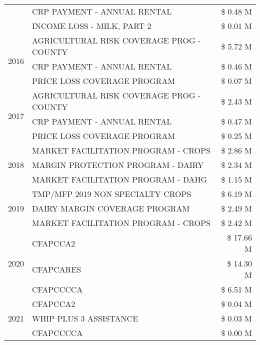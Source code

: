 \begin{tabular}{llr}
 & CRP PAYMENT - ANNUAL RENTAL & \$ 0.48 M \\
 & INCOME LOSS - MILK, PART 2 & \$ 0.01 M \\
\cline{1-3}
\multirow[t]{3}{*}{2016} & AGRICULTURAL RISK COVERAGE PROG - COUNTY & \$ 5.72 M \\
 & CRP PAYMENT - ANNUAL RENTAL & \$ 0.46 M \\
 & PRICE LOSS COVERAGE PROGRAM & \$ 0.07 M \\
\cline{1-3}
\multirow[t]{3}{*}{2017} & AGRICULTURAL RISK COVERAGE PROG - COUNTY & \$ 2.43 M \\
 & CRP PAYMENT - ANNUAL RENTAL & \$ 0.47 M \\
 & PRICE LOSS COVERAGE PROGRAM & \$ 0.25 M \\
\cline{1-3}
\multirow[t]{3}{*}{2018} & MARKET FACILITATION PROGRAM - CROPS & \$ 2.86 M \\
 & MARGIN PROTECTION PROGRAM - DAIRY & \$ 2.34 M \\
 & MARKET FACILITATION PROGRAM - DAHG & \$ 1.15 M \\
\cline{1-3}
\multirow[t]{3}{*}{2019} & TMP/MFP 2019 NON SPECIALTY CROPS & \$ 6.19 M \\
 & DAIRY MARGIN COVERAGE PROGRAM & \$ 2.49 M \\
 & MARKET FACILITATION PROGRAM - CROPS & \$ 2.42 M \\
\cline{1-3}
\multirow[t]{3}{*}{2020} & CFAPCCA2 & \$ 17.66 M \\
 & CFAPCARES & \$ 14.30 M \\
 & CFAPCCCCA & \$ 6.51 M \\
\cline{1-3}
\multirow[t]{3}{*}{2021} & CFAPCCA2 & \$ 0.04 M \\
 & WHIP PLUS 3 ASSISTANCE & \$ 0.03 M \\
 & CFAPCCCCA & \$ 0.00 M \\
\cline{1-3}
\bottomrule
\end{tabular}
